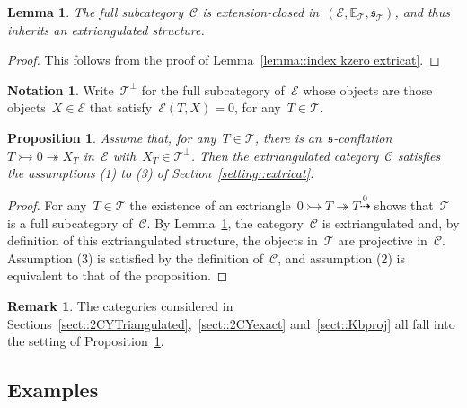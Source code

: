 \documentclass{amsart}
\newtheorem{corollary}[theorem]{Corollary}
\newtheorem{proposition}[theorem]{Proposition}
\newtheorem{lemma}[theorem]{Lemma}
\theoremstyle{definition}
\newtheorem{remark}[theorem]{Remark}
\newtheorem{notation}[theorem]{Notation}
\newcommand{\cat}{\mathcal{C}}
\newcommand{\tc}{\mathcal{T}}
\newcommand{\ec}{\mathcal{E}}
\newcommand{\infl}{\rightarrowtail}
\newcommand{\defl}{\twoheadrightarrow}
\begin{document}
\begin{lemma}\label{lemma:: prT is extriangulated}
 The full subcategory~$\cat$ is extension-closed in~$(\ec,\mathbb{E}_\tc,\mathfrak{s}_\tc)$, and thus inherits an extriangulated structure.
\end{lemma}

\begin{proof}
 This follows from the proof of Lemma~\ref{lemma::index kzero extricat}.
\end{proof}

\begin{notation}
 Write~$\tc^\perp$ for the full subcategory of~$\ec$ whose objects are those objects~$X\in\ec$ that satisfy~$\ec(T,X)=0$, for any~$T\in\tc$.
\end{notation}

\begin{proposition}\label{prop::prT}
Assume that, for any~$T\in\tc$, there is an~$\mathfrak{s}$-conflation~$T\infl 0\defl X_T$ in~$\ec$ with~$X_T\in\tc^\perp$.
Then the extriangulated category~$\cat$ satisfies the assumptions (1) to (3) of Section~\ref{setting::extricat}.
\end{proposition}

\begin{proof}
For any~$T\in\tc$ the existence of an extriangle~$0\infl T\defl T\overset{0}{\dashrightarrow}$ shows that~$\tc$ is a full subcategory of~$\cat$.
By Lemma~\ref{lemma:: prT is extriangulated}, the category~$\cat$ is extriangulated and, by definition of this extriangulated structure, the objects in~$\tc$ are projective in~$\cat$.
Assumption (3) is satisfied by the definition of~$\cat$, and assumption (2) is equivalent to that of the proposition.
\end{proof}

\begin{remark}
 The categories considered in Sections~\ref{sect::2CYTriangulated},~\ref{sect::2CYexact} and~\ref{sect::Kbproj} all fall into the setting of Proposition~\ref{prop::prT}.
\end{remark}



\subsection{Examples}
\end{document}
